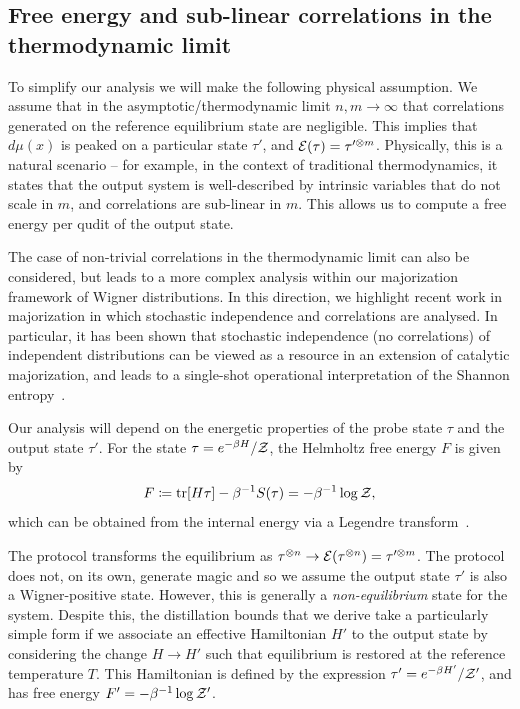 \documentclass[pra,
aps,
twocolumn,
superscriptaddress,
groupedaddress,
nofootinbib,
reprint
]{revtex4-1}
\begin{document}
\subsection{Free energy and sub-linear correlations in the thermodynamic limit}
To simplify our analysis we will make the following physical assumption. We assume that in the asymptotic/thermodynamic limit $n,m \rightarrow \infty$ that correlations generated on the reference equilibrium state are negligible. This implies that $d\mu(x)$ is peaked on a particular state $\tau'$, and ${\mathcal E}(\tau) = \tau'^{\otimes m}$. Physically, this is a natural scenario -- for example, in the context of traditional thermodynamics, it states that the output system is well-described by intrinsic variables that do not scale in $m$, and correlations are sub-linear in $m$. This allows us to compute a free energy per qudit of the output state.

The case of non-trivial correlations in the thermodynamic limit can also be considered, but leads to a more complex analysis within our majorization framework of Wigner distributions. In this direction, we highlight recent work in majorization in which stochastic independence and correlations are analysed. In particular, it has been shown that stochastic independence (no correlations) of independent distributions can be viewed as a resource in an extension of catalytic majorization, and leads to a single-shot operational interpretation of the Shannon entropy~\cite{muller_2015, muller_2016, muller_2019}.

Our analysis will depend on the energetic properties of the probe state $\tau$ and the output state $\tau'$.
For the state $\tau = e^{-\beta H}/\mathcal{Z}$, the Helmholtz free energy $F$ is given by
\begin{equation}
	F \coloneqq \mbox{tr}[H \tau] - \beta^{-1}S(\tau) = -\beta^{-1}\log{\mathcal{Z}},
\end{equation}
which can be obtained from the internal energy via a Legendre transform~\cite{Pathria_1997}.

The protocol transforms the equilibrium as $\tau^{\otimes n} \rightarrow {\mathcal E}(\tau^{\otimes n}) = \tau^{\prime \otimes m}$.  The protocol does not, on its own, generate magic and so we assume the output state $\tau'$ is also a Wigner-positive state. However, this is generally a \emph{non-equilibrium} state for the system. Despite this, the distillation bounds that we derive take a particularly simple form if we associate an effective Hamiltonian $H'$ to the output state by considering the change $H \rightarrow H'$ such that equilibrium is restored at the reference temperature $T$. This Hamiltonian is defined by the expression $\tau' = e^{-\beta H'}/\mathcal{Z}'$, and has free energy $F' = -\beta^{-1} \log \mathcal{Z}'$.
\end{document}
